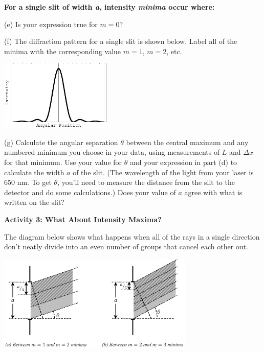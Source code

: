 \answerspace{0.1in}
\hspace{0.8in}\textbf{For a single slit of width \textit{a}, intensity \textit{minima} occur where: }
\answerspace{0.1in}

(e) Is your expression true for $m=0$?
\answerspace{0.4in}

(f) The diffraction pattern for a single slit is shown below.  Label all of the minima with the corresponding value $m=1$, $m=2$, etc.  

\begin{center}
\includegraphics[width=0.4\textwidth]{diffraction_of_light/diffraction_of_light_fig_3.eps}
\end{center}

\pagebreak[3]

(g) Calculate the angular separation $\theta$ between the central maximum and any numbered minimum you choose in your data, using measurements of $L$ and $\Delta x$ for that minimum.  Use your value for $\theta$ and your expression in part (d) to calculate the width $a$ of the slit.  (The wavelength of the light from your laser is 650 nm.  To get $\theta$, you'll need to measure the distance from the slit to the detector and do some calculations.)    Does your value of $a$ agree with what is written on the slit?
\answerspace{1.0in}


\textbf{Activity 3: What About Intensity Maxima?}

The diagram below shows what happens when all of the rays in a single direction don't neatly divide into an even number of groups that cancel each other out.

\vspace{-0.2in}
\begin{center}
\includegraphics[width=0.7\textwidth]{diffraction_of_light/diffraction_maxima.eps}
\end{center}
\vspace{-0.2in}


